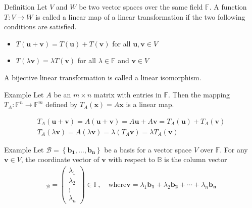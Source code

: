 \documentclass{report}
\renewcommand{\vec}{\mathbf}
\newcommand{\cvec}[1]{ \begin{pmatrix} #1 \end{pmatrix} }
\begin{document}
\begin{enumerate}
	\begin{question}{Definition}
		Let $V$ and $W$ be two vector spaces over the same field $\mathbb{F}$. A function $T: V \to W$ is called a linear map of a linear transformation if the two following conditions are satisfied.
		\begin{itemize}
			\item $T(\vec{u} + \vec{v}) = T(\vec{u}) + T(\vec{v})$ for all $\vec{u}, \vec{v} \in V$
			\item $T(\lambda \vec{v}) = \lambda T(\vec{v})$ for all $\lambda \in \mathbb{F}$ and $\vec{v} \in V$
		\end{itemize}
		A bijective linear transformation is called a linear isomorphism.
	\end{question}
	\begin{question}{Example}
		Let $A$ be an $m \times n$ matrix with entries in $\mathbb{F}$. Then the mapping $T_A:\mathbb{F}^n \to \mathbb{F}^m$ defined by $T_A(\vec{x}) = A\vec{x}$ is a linear map.

		\begin{align*}
			T_A(\vec{u} + \vec{v}) = A(\vec{u} + \vec{v}) = A\vec{u} + A\vec{v} = T_A(\vec{u}) + T_A(\vec{v})	\\
			T_A(\lambda \vec{v}) = A(\lambda \vec{v}) = \lambda(T_A\vec{v}) = \lambda T_A(\vec{v})
		\end{align*}
	\end{question}
	\begin{question}{Example}
		Let $\mathcal{B} = \left\{\vec{b_1},\dots,\vec{b_n}\right\}$ be a basis for a vector space $V$ over $\mathbb{F}$. For any $\vec{v} \in V$, the coordinate vector of $\vec{v}$ with respect to $\mathbb{B}$ is the column vector
		\begin{align*}
			[\vec{v}]_\mathcal{B} = \cvec{\lambda_1\\\lambda_2\\\vdots\\\lambda_n} \in \mathbb{F}, \quad \text{where} \vec{v} = \lambda_1 \vec{b_1} + \lambda_2 \vec{b_2} + \cdots + \lambda_n \vec{b_n}
		\end{align*}


\end{question}
\end{enumerate}
\end{document}
